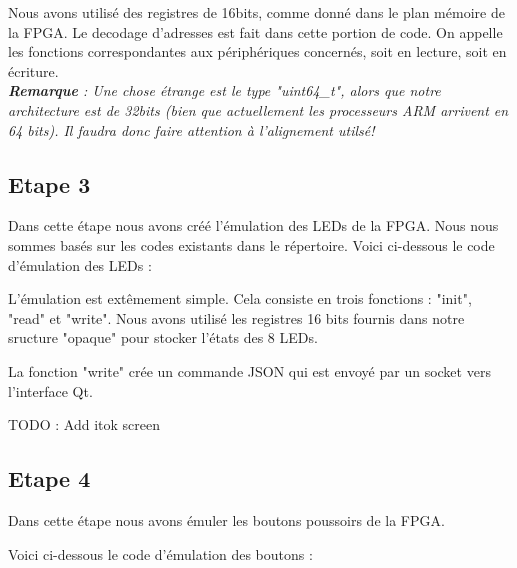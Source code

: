 Nous avons utilisé des registres de 16bits, comme donné dans le plan mémoire de la FPGA.
Le decodage d'adresses est fait dans cette portion de code. On appelle les fonctions correspondantes aux périphériques concernés, soit en lecture, soit en écriture.\\

\textit{\textbf{Remarque} : Une chose étrange est le type "uint64\_t", alors que notre architecture est de 32bits (bien que actuellement les processeurs ARM arrivent en 64 bits). Il faudra donc faire attention à l'alignement utilsé!}
\pagebreak

\subsection{Etape 3}
Dans cette étape nous avons créé l'émulation des LEDs de la FPGA. Nous nous sommes basés sur les codes existants dans le répertoire. Voici ci-dessous le code d'émulation des LEDs : 


\vspace{0.5cm} 

\vspace{0.5cm} 

L'émulation est extêmement simple. Cela consiste en trois fonctions : "init", "read" et "write". Nous avons utilisé les registres 16 bits fournis dans notre sructure "opaque" pour stocker l'états des 8 LEDs.

La fonction "write" crée un commande JSON qui est envoyé par un socket vers l'interface Qt.

TODO : Add itok screen

\subsection{Etape 4}
Dans cette étape nous avons émuler les boutons poussoirs de la FPGA. 

Voici ci-dessous le code d'émulation des boutons : 


\vspace{0.5cm} 

\vspace{0.5cm} 

